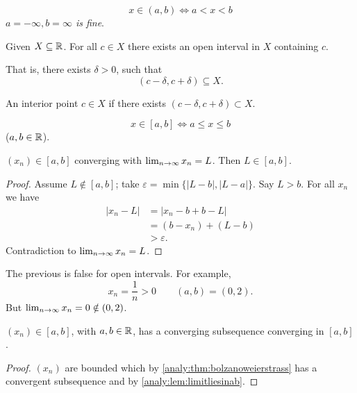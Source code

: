 \documentclass[10pt, a4paper]{article}
\begin{document}
\begin{definition}
    \[
    x \in (a, b) \iff a < x < b
    \]
    \textit{$a = -\infty, b = \infty$ is fine}.
\end{definition}

\begin{definition}
    Given $X \subseteq \mathbb{R}$. For all $c \in X$ there exists an open interval in $X$ containing $c$.
    
    That is,
    there exists $\delta > 0$,
    such that
    \[
    (c - \delta, c + \delta) \subseteq X.
    \]
\end{definition}

\begin{definition}
    An interior point $c \in X$ if there exists $(c - \delta, c + \delta) \subset X$.
\end{definition}

\begin{definition}
    \[
    x \in [a, b] \iff a \leq x \leq b
    \]
    ($a, b \in \mathbb{R}$).
\end{definition}

\begin{lemma}\label{analy:lem:limitliesinab}
    $(x_n) \in [a, b]$ converging with $\lim_{n \rightarrow \infty} x_n = L$.
    Then $L \in [a, b]$.
    \begin{proof}
        Assume $L \notin [a, b]$;
        take $\varepsilon = \min\{|L - b|, |L - a|\}$.
        Say $L > b$.
        For all $x_n$ we have
        \begin{align*}
            |x_n - L| &= |x_n - b + b - L| \\
            &= (b - x_n) + (L - b) \\
            &> \varepsilon.
        \end{align*}
        Contradiction to $\lim_{n \rightarrow \infty} x_n = L$.
    \end{proof}
\end{lemma}

\begin{remark}
    The previous is false for open intervals.
    For example,
    \[
    x_n = \frac{1}{n} > 0\qquad(a, b) = (0, 2).
    \]
    But $\lim_{n \rightarrow \infty} x_n = 0 \notin (0, 2)$.
\end{remark}

\begin{theorem}
    $(x_n) \in [a, b]$,
    with $a, b \in \mathbb{R}$,
    has a converging subsequence converging in $[a, b]$.
    \begin{proof}
        $(x_n)$ are bounded which by \autoref{analy:thm:bolzanoweierstrass} has a convergent subsequence and by \autoref{analy:lem:limitliesinab}.
    \end{proof}
\end{theorem}
\end{document}
